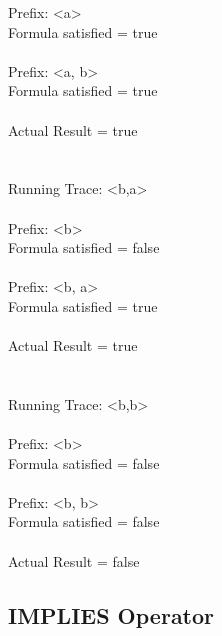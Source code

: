   Prefix: \textless a\textgreater\\
  Formula satisfied = true\\
\\
  Prefix: \textless a, b\textgreater\\
  Formula satisfied = true\\
\\
  Actual Result = true\\
\\
\\
Running Trace: \textless b,a\textgreater\\
\\
  Prefix: \textless b\textgreater\\
  Formula satisfied = false\\
\\
  Prefix: \textless b, a\textgreater\\
  Formula satisfied = true\\
\\
  Actual Result = true\\
\\
\\
Running Trace: \textless b,b\textgreater\\
\\
  Prefix: \textless b\textgreater\\
  Formula satisfied = false\\
\\
  Prefix: \textless b, b\textgreater\\
  Formula satisfied = false\\
\\
  Actual Result = false\\

\subsection{IMPLIES Operator}

